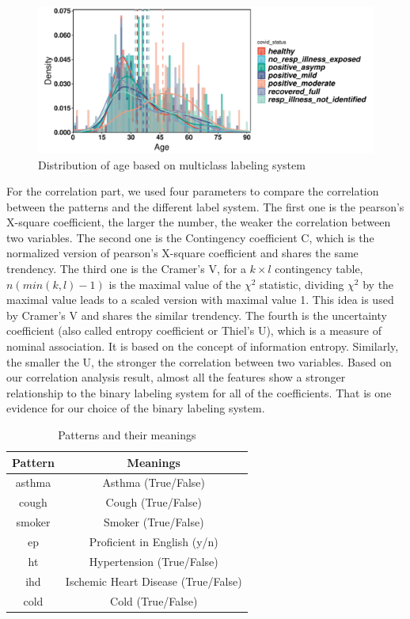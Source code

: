 \documentclass[11pt]{article}
\begin{document}
\begin{figure}[htbp]{}
	\centering
    \includegraphics[width=.8\textwidth]{./imgs/distri_status_age.pdf} %
    \caption{Distribution of age based on multiclass labeling system}
    \label{fig:distri_status_age}
\end{figure}

For the correlation part, we used four parameters to compare the correlation between the patterns and the different label system. The first one is the pearson’s X-square coefficient, the larger the number, the weaker the correlation between two variables.  The second one is the Contingency coefficient C, which is the normalized version of pearson’s X-square coefficient and shares the same trendency. The third one is the Cramer’s V, for a $k \times l$ contingency table, $n(min(k,l)-1)$ is the maximal value of the $\chi^2$ statistic, dividing $\chi^2$ by the maximal value leads to a scaled version with maximal value 1. This idea is used by Cramer’s V and shares the similar trendency. The fourth is the uncertainty coefficient (also called entropy coefficient or Thiel’s U), which is a measure of nominal association. It is based on the concept of information entropy. Similarly, the smaller the U, the stronger the correlation between two variables. Based on our correlation analysis result, almost all the features show a stronger relationship to the binary labeling system for all of the coefficients. That is one evidence for our choice of the binary labeling system.

\begin{table}
	\centering
	\caption{Patterns and their meanings}
	\begin{tabular}[!htbp]{cc}
	\toprule[1.5pt]
	Pattern & Meanings\\
	\midrule[1pt]
	asthma & Asthma (True/False)\\
	cough & Cough (True/False)\\
	smoker & Smoker (True/False)\\
	ep & Proficient in English (y/n)\\
	ht & Hypertension  (True/False)\\
	ihd & Ischemic Heart Disease (True/False)\\
	cold & Cold (True/False)\\
	\bottomrule[1.5pt]
	\end{tabular}
\end{table}
\end{document}
